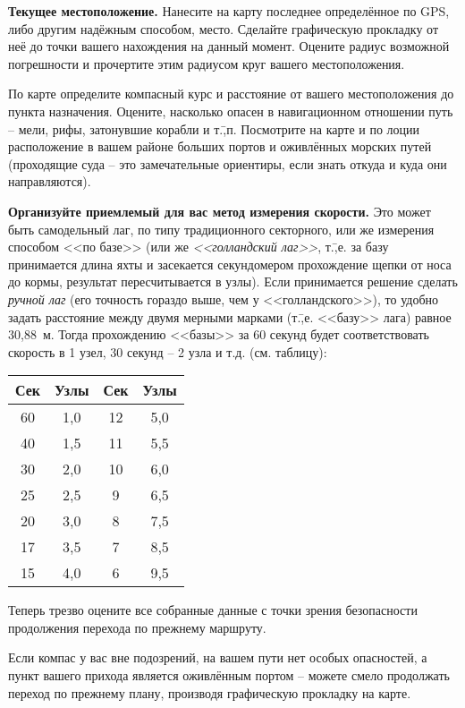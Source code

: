 \textbf{Текущее местоположение.} Нанесите на карту последнее
определённое по GPS, либо другим надёжным способом, место. Сделайте
графическую прокладку от неё до точки вашего нахождения на данный
момент. Оцените радиус возможной погрешности и прочертите этим
радиусом круг вашего местоположения.

По карте определите компасный курс и расстояние от вашего
местоположения до пункта назначения. Оцените, насколько опасен в
навигационном отношении путь \--- мели, рифы, затонувшие корабли и
т.\=,п. Посмотрите на карте и по лоции расположение в вашем районе
больших портов и оживлённых морских путей (проходящие суда \--- это
замечательные ориентиры, если знать откуда и куда они направляются).

\textbf{Организуйте приемлемый для вас метод измерения скорости.} Это
может быть самодельный лаг, по типу традиционного секторного, или же
измерения способом <<по базе>> (или же
\textit{<<голландский лаг>>}, т.\=,е. за
базу принимается длина яхты и засекается секундомером прохождение
щепки от носа до кормы, результат пересчитывается в узлы). Если
принимается решение сделать \textit{ручной лаг} (его точность гораздо выше, чем
у <<голландского>>), то удобно задать расстояние между двумя мерными
марками (т.\=,е. <<базу>> лага) равное 30,88~м. Тогда прохождению
<<базы>> за 60 секунд будет соответствовать скорость в 1 узел, 30
секунд \--- 2 узла и т.д. (см. таблицу):

\begin{tabular}{c|c||c|c}
  \toprule
  Сек & Узлы & Сек & Узлы \\
  \midrule
  60 & 1,0 & 12 & 5,0 \\
  40 & 1,5 & 11 & 5,5 \\
  30 & 2,0 & 10 & 6,0 \\
  25 & 2,5 & 9  & 6,5 \\
  20 & 3,0 & 8  & 7,5 \\
  17 & 3,5 & 7  & 8,5 \\
  15 & 4,0 & 6  & 9,5 \\
  \bottomrule
\end{tabular}

Теперь трезво оцените все собранные данные с точки зрения безопасности
продолжения перехода по прежнему маршруту.

Если компас у вас вне подозрений, на вашем пути нет особых опасностей,
а пункт вашего прихода является оживлённым портом \--- можете смело
продолжать переход по прежнему плану, производя графическую прокладку
на карте.

